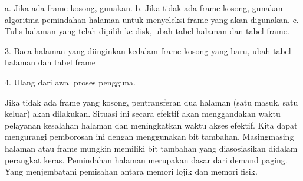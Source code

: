 a. Jika ada frame kosong, gunakan.
b. Jika tidak ada frame kosong, gunakan algoritma pemindahan halaman untuk menyeleksi frame yang akan digunakan.
c. Tulis halaman yang telah dipilih ke disk, ubah tabel halaman dan tabel frame.

3. Baca halaman yang diinginkan kedalam frame kosong yang baru, ubah tabel halaman dan tabel frame
 
4. Ulang dari awal proses pengguna.

Jika tidak ada frame yang kosong, pentransferan dua halaman (satu masuk, satu keluar) akan dilakukan. Situasi ini secara efektif akan menggandakan waktu pelayanan kesalahan halaman dan meningkatkan waktu akses efektif. Kita dapat mengurangi pemborosan ini dengan menggunakan bit tambahan. Masingmasing halaman atau frame mungkin memiliki bit tambahan yang diasosiasikan didalam perangkat keras. Pemindahan halaman merupakan dasar dari demand paging. Yang menjembatani pemisahan antara memori lojik dan memori fisik. 